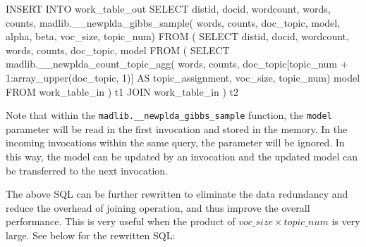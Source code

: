 \begin{sql}[emph={work_table_out,work_table_in,__newplda_gibbs_sample,__newplda_count_topic_agg,model}]
    INSERT INTO work_table_out
    SELECT  
        distid, 
        docid, 
        wordcount, 
        words, 
        counts,  
        madlib.__newplda_gibbs_sample(
            words, 
            counts, 
            doc_topic, 
            model, 
            alpha, 
            beta, 
            voc_size, 
            topic_num)
    FROM
    (
        SELECT
            distid, 
            docid, 
            wordcount, 
            words,
            counts, 
            doc_topic, 
            model 
        FROM
        (
                SELECT
                    madlib.__newplda_count_topic_agg(
                        words, 
                        counts,
                        doc_topic[topic_num + 1:array_upper(doc_topic, 1)] AS topic_assignment, 
                        voc_size, 
                        topic_num) model 
                FROM 
                    work_table_in 
        ) t1 
        JOIN 
        work_table_in
    ) t2
\end{sql}

Note that within the \texttt{madlib.\_\_newplda\_gibbs\_sample} function, the \texttt{model} parameter will be read in the first invocation and stored in the memory. In the incoming invocations within the same query, the parameter will be ignored. In this way, the model can be updated by an invocation and the updated model can be transferred to the next invocation.

The above SQL can be further rewritten to eliminate the data redundancy and reduce the overhead of joining operation, and thus improve the overall performance. This is very useful when the product of $voc\_size \times topic\_num$ is very large. See below for the rewritten SQL:

